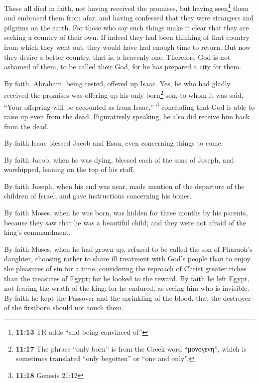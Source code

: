  These all died in faith, not having received the
promises, but having seen\footnote{\textbf{11:13} TR adds ``and being
  convinced of''} them and embraced them from afar, and having confessed
that they were strangers and pilgrims on the earth.  For
those who say such things make it clear that they are seeking a country
of their own.  If indeed they had been thinking of that
country from which they went out, they would have had enough time to
return.  But now they desire a better country, that is, a
heavenly one. Therefore God is not ashamed of them, to be called their
God, for he has prepared a city for them.

 By faith, Abraham, being tested, offered up Isaac. Yes,
he who had gladly received the promises was offering up his only
born\footnote{\textbf{11:17} The phrase ``only born'' is from the Greek
  word ``μονογενη'', which is sometimes translated ``only begotten'' or
  ``one and only''.} son,  to whom it was said, ``Your
offspring will be accounted as from Isaac,'' \footnote{\textbf{11:18}
  Genesis 21:12}  concluding that God is able to raise up
even from the dead. Figuratively speaking, he also did receive him back
from the dead.

 By faith Isaac blessed Jacob and Esau, even concerning
things to come.

 By faith Jacob, when he was dying, blessed each of the
sons of Joseph, and worshipped, leaning on the top of his staff.

 By faith Joseph, when his end was near, made mention of
the departure of the children of Israel, and gave instructions
concerning his bones.

 By faith Moses, when he was born, was hidden for three
months by his parents, because they saw that he was a beautiful child;
and they were not afraid of the king's commandment.

 By faith Moses, when he had grown up, refused to be
called the son of Pharaoh's daughter,  choosing rather to
share ill treatment with God's people than to enjoy the pleasures of sin
for a time,  considering the reproach of Christ greater
riches than the treasures of Egypt; for he looked to the reward.
 By faith he left Egypt, not fearing the wrath of the
king; for he endured, as seeing him who is invisible.  By
faith he kept the Passover and the sprinkling of the blood, that the
destroyer of the firstborn should not touch them.

